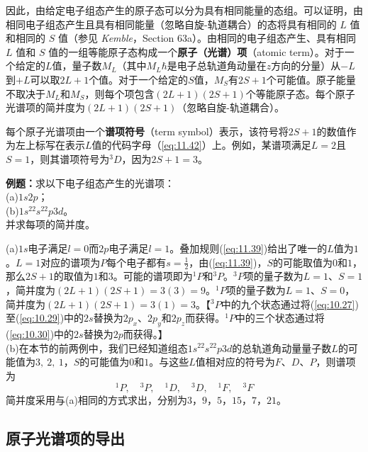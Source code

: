     因此，由给定电子组态产生的原子态可以分为具有相同能量的态组。可以证明，由相同电子组态产生且具有相同能量（忽略自旋-轨道耦合）的态将具有相同的 $L$ 值和相同的 $S$ 值（参见 \textit{Kemble}，Section 63a）。由相同的电子组态产生、具有相同 $L$ 值和 $S$ 值的一组等能原子态构成一个\textbf{原子（光谱）项}（atomic term）。对于一个给定的$L$值，量子数$M_L$（其中$M_L\hbar$是电子总轨道角动量在$z$方向的分量）从$-L$到$+L$可以取$2L+1$个值。对于一个给定的$S$值，$M_S$有$2S+1$个可能值。原子能量不取决于$M_L$和$M_S$，则每个项包含$\left(2L+1\right)\left(2S+1\right)$个等能原子态。每个原子光谱项的简并度为$\left(2L+1\right)\left(2S+1\right)$（忽略自旋-轨道耦合）。

    每个原子光谱项由一个\textbf{谱项符号}（term symbol）表示，该符号将$2S +1$的数值作为左上标写在表示$L$值的代码字母（\ref{eq:11.42}）上。例如，某谱项满足$L=2$且$S=1$，则其谱项符号为$^3D$，因为$2S+1=3$。

    \begin{examplebox}
        \textbf{例题：}求以下电子组态产生的光谱项：\\
        (a)$1s2p$；\\
        (b)$1s^22s^22p3d$。\\
        并求每项的简并度。

        (a)$1s$电子满足$l=0$而$2p$电子满足$l=1$。叠加规则(\ref{eq:11.39})给出了唯一的$L$值为$1$。$L=1$对应的谱项为$P$每个电子都有$s = \frac{1}{2}$，由(\ref{eq:11.39})，$S$的可能取值为$0$和$1$，那么$2S+1$的取值为$1$和$3$。可能的谱项即为$^1P$和$^3P$。$^3P$项的量子数为$L=1$、$S=1$，简并度为$\left(2L+1\right)\left(2S+1\right)=3\left(3\right)=9$。$^1P$项的量子数为$L=1$、$S=0$，简并度为$\left(2L+1\right)\left(2S+1\right)=3\left(1\right)=3$。【$^3P$中的九个状态通过将(\ref{eq:10.27})至(\ref{eq:10.29})中的$2s$替换为$2p_x$、$2p_y$和$2p_z$而获得。$^1P$中的三个状态通过将(\ref{eq:10.30})中的$2s$替换为$2p$而获得。】 \\
        (b)在本节的前两例中，我们已经知道组态$1s^22s^22p3d$的总轨道角动量量子数$L$的可能值为$3, \: 2, \: 1$，$S$的可能值为$0$和$1$。与这些$L$值相对应的符号为$F$、$D$、$P$，则谱项为
        \begin{equation}
            ^1P, \quad ^3P, \quad ^1D, \quad ^3D, \quad ^1F, \quad ^3F
            \label{eq:11.44}
        \end{equation}
        简并度采用与(a)相同的方式求出，分别为$3$，$9$，$5$，$15$，$7$，$21$。
    \end{examplebox}

\subsection*{原子光谱项的导出}

